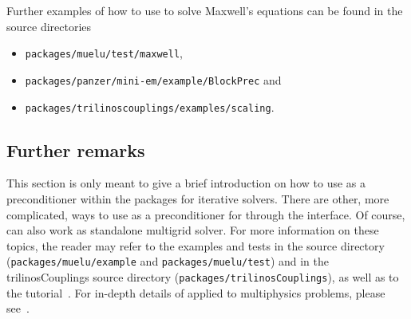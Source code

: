 Further examples of how to use \muelu to solve Maxwell's equations can be found in the \trilinos source directories
\begin{itemize}
  \setlength{\itemsep}{-10pt}
\item \texttt{packages/muelu/test/maxwell},
\item \texttt{packages/panzer/mini-em/example/BlockPrec} and
\item \texttt{packages/trilinoscouplings/examples/scaling}.
\end{itemize}




\subsection{Further remarks}

This section is only meant to give a brief introduction on how to use \muelu{}
as a preconditioner within the \trilinos{} packages for iterative solvers. There
are other, more complicated, ways to use \muelu{} as a preconditioner for \belos
through the \xpetra interface. Of course, \muelu{} can also work as
standalone multigrid solver. For more information on these topics, the reader
may refer to the examples and tests in the \muelu{} source directory
(\texttt{packages/muelu/example} and \texttt{packages/muelu/test}) and in the trilinosCouplings source directory
(\texttt{packages/trilinosCouplings}), as well as to the \muelu{}
tutorial~\cite{MueLuTutorial}.
For in-depth details of \muelu applied to multiphysics problems, please see~\cite{Wiesner2014}.

